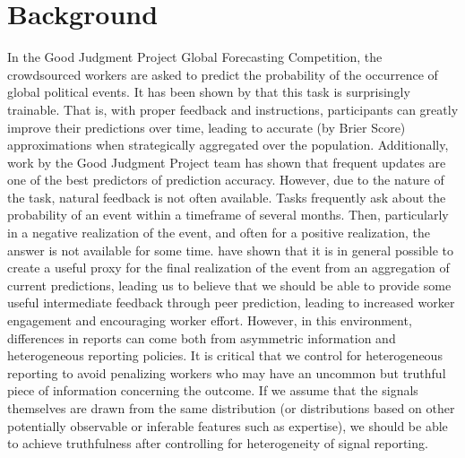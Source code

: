 \documentclass[a4paper, 12pt]{article}
\begin{document}
\section{Background}
In the Good Judgment Project Global Forecasting Competition, the crowdsourced workers are asked to predict the probability of the occurrence of global political events. It has been shown by \citet{ungar2012good} that this task is surprisingly trainable. That is, with proper feedback and instructions, participants can greatly improve their predictions over time, leading to accurate (by Brier Score) approximations when strategically aggregated over the population. Additionally, work by the Good Judgment Project team has shown that frequent updates are one of the best predictors of prediction accuracy. However, due to the nature of the task, natural feedback is not often available. Tasks frequently ask about the probability of an event within a timeframe of several months. Then, particularly in a negative realization of the event, and often for a positive realization, the answer is not available for some time. \citet{witkowski2017proper} have shown that it is in general possible to create a useful proxy for the final realization of the event from an aggregation of current predictions, leading us to believe that we should be able to provide some useful intermediate feedback through peer prediction, leading to increased worker engagement and encouraging worker effort. However, in this environment, differences in reports can come both from asymmetric information and heterogeneous reporting policies. It is critical that we control for heterogeneous reporting to avoid penalizing workers who may have an uncommon but truthful piece of information concerning the outcome. If we assume that the signals themselves are drawn from the same distribution (or distributions based on other potentially observable or inferable features such as expertise), we should be able to achieve truthfulness after controlling for heterogeneity of signal reporting. 
\end{document}

